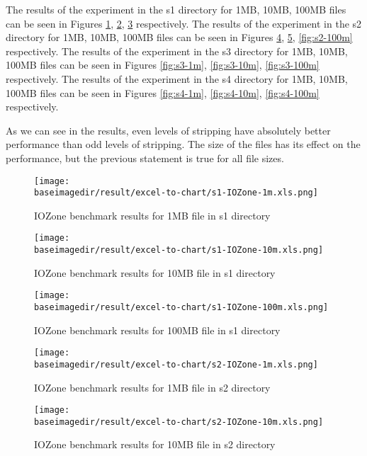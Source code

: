 \documentclass{article}
\newcommand{\baseimagedir}{..}
\begin{document}
The results of the experiment in the s1 directory for 1MB, 10MB, 100MB files can be seen in Figures \ref{fig:s1-1m}, \ref{fig:s1-10m}, \ref{fig:s1-100m} respectively. The results of the experiment in the s2 directory for 1MB, 10MB, 100MB files can be seen in Figures \ref{fig:s2-1m}, \ref{fig:s2-10m}, \ref{fig:s2-100m} respectively. The results of the experiment in the s3 directory for 1MB, 10MB, 100MB files can be seen in Figures \ref{fig:s3-1m}, \ref{fig:s3-10m}, \ref{fig:s3-100m} respectively. The results of the experiment in the s4 directory for 1MB, 10MB, 100MB files can be seen in Figures \ref{fig:s4-1m}, \ref{fig:s4-10m}, \ref{fig:s4-100m} respectively.

As we can see in the results, even levels of stripping have absolutely better performance than odd levels of stripping. The size of the files has its effect on the performance, but the previous statement is true for all file sizes. 

\begin{figure}
    \centering
    \texttt{[image: \\baseimagedir/result/excel-to-chart/s1-IOZone-1m.xls.png]}
    \caption{IOZone benchmark results for 1MB file in s1 directory}
    \label{fig:s1-1m}
\end{figure}

\begin{figure}
    \centering
    \texttt{[image: \\baseimagedir/result/excel-to-chart/s1-IOZone-10m.xls.png]}
    \caption{IOZone benchmark results for 10MB file in s1 directory}
    \label{fig:s1-10m}
\end{figure}

\begin{figure}
    \centering
    \texttt{[image: \\baseimagedir/result/excel-to-chart/s1-IOZone-100m.xls.png]}
    \caption{IOZone benchmark results for 100MB file in s1 directory}
    \label{fig:s1-100m}
\end{figure}

\begin{figure}
    \centering
    \texttt{[image: \\baseimagedir/result/excel-to-chart/s2-IOZone-1m.xls.png]}
    \caption{IOZone benchmark results for 1MB file in s2 directory}
    \label{fig:s2-1m}
\end{figure}

\begin{figure}
    \centering
    \texttt{[image: \\baseimagedir/result/excel-to-chart/s2-IOZone-10m.xls.png]}
    \caption{IOZone benchmark results for 10MB file in s2 directory}
    \label{fig:s2-10m}
\end{figure}
\end{document}
